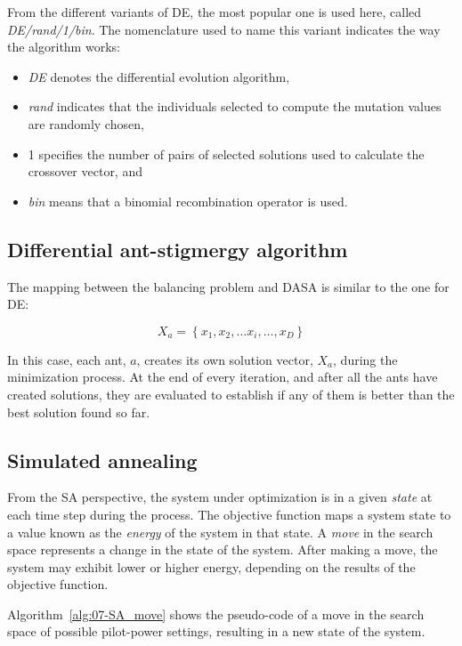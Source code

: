 From the different variants of DE, the most popular one is used here,
called \emph{DE/rand/1/bin}. The nomenclature used to name this variant
indicates the way the algorithm works:
\begin{itemize}
\item \emph{DE }denotes the differential evolution algorithm,
\item \emph{rand }indicates that the individuals selected to compute the
mutation values are randomly chosen,
\item 1\emph{ }specifies the number of pairs of selected solutions used
to calculate the crossover vector, and
\item \emph{bin }means that a binomial recombination operator is used.
\end{itemize}

\subsection{Differential ant-stigmergy algorithm}

The mapping between the balancing problem and DASA is similar to the
one for DE:

\begin{equation}
X_{a}=\left\{ x_{1},x_{2},\ldots x_{i},\ldots,x_{D}\right\} \label{eq:07-DASA_mapping}
\end{equation}


\noindent In this case, each ant, $a$, creates its own solution vector,
$X_{a}$, during the minimization process. At the end of every iteration,
and after all the ants have created solutions, they are evaluated
to establish if any of them is better than the best solution found
so far.


\subsection{Simulated annealing}

From the SA perspective, the system under optimization is in a given
\emph{state} at each time step during the process. The objective function
maps a system state to a value known as the \emph{energy} of the system
in that state. A \emph{move} in the search space represents a change
in the state of the system. After making a move, the system may exhibit
lower or higher energy, depending on the results of the objective
function.

Algorithm~\ref{alg:07-SA_move} shows the pseudo-code of a move in
the search space of possible pilot-power settings, resulting in a
new state of the system.

